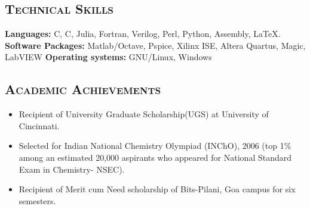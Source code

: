 \documentclass[10pt]{article}
\newcommand{\CPP}
{C\nolinebreak[4]\hspace{-.05em}\raisebox{.22ex}{\footnotesize\bf ++}}
\begin{document}
\subsection*{\textsc{\large Technical Skills}}
\textbf{Languages:} C, \CPP , Julia, Fortran, Verilog, Perl, Python, Assembly, \LaTeX. \newline
\textbf{Software Packages:} Matlab/Octave, Pspice, Xilinx ISE, Altera Quartus, Magic, LabVIEW \newline
\textbf{Operating systems:} GNU/Linux, Windows


\subsection*{\textsc{\large Academic Achievements}}
\begin{itemize}
\item Recipient of University Graduate Scholarship(UGS) at University of Cincinnati.
\item Selected for Indian National Chemistry Olympiad (INChO), 2006 (top 1\% among an estimated 20,000 aspirants who appeared for National Standard Exam in Chemistry- NSEC).
\item Recipient of Merit cum Need scholarship of Bits-Pilani, Goa campus for six semesters.
\end{itemize}
\end{document}
